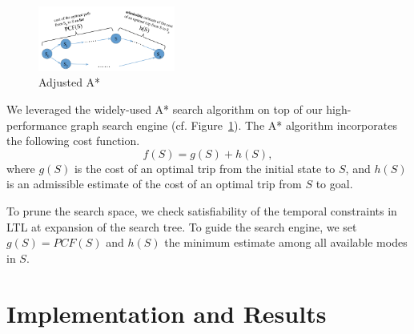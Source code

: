 \documentclass[letterpaper]{article}
\newcommand{\PCF}{\mathit{PCF}}
\newcommand{\figref}[1]{Figure~\ref{fig:#1}}
\begin{document}
\begin{figure}[!ht]
  \centering
    \includegraphics[width=0.4\textwidth]{figs/Astar.pdf}
  \caption{Adjusted A*\label{fig:astar}}
\end{figure}

We leveraged the widely-used A* search algorithm on top of our high-performance graph search
engine (cf. \figref{astar}).  The A* algorithm incorporates the following cost function.
\begin{equation}
	f(S) = g(S) + h(S),
\end{equation}
where $g(S)$ is the cost of an optimal trip from the initial state to $S$, and
$h(S)$ is an admissible estimate of the cost of an optimal trip from $S$ to goal.

To prune the search space, we check satisfiability of the temporal constraints in LTL
at expansion of the search tree.
To guide the search engine, we set $g(S)=\PCF(S)$ and $h(S)$ the minimum estimate among
all available modes in $S$.

\section{Implementation and Results}
\end{document}
